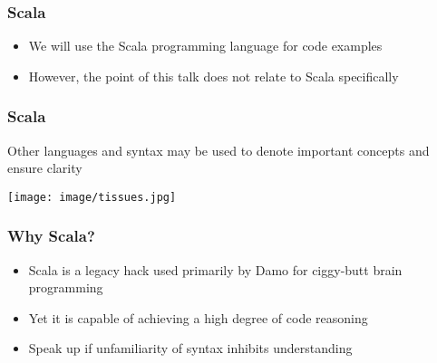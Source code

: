 \begin{frame}
\frametitle{Scala}
\begin{itemize}
  \item We will use the Scala programming language for code examples
  \item However, the point of this talk does not relate to Scala specifically
\end{itemize}
\end{frame}

\begin{frame}
\frametitle{Scala}
\begin{center}
Other languages and syntax may be used to denote important concepts and ensure clarity
\end{center}
\begin{center}
\texttt{[image: image/tissues.jpg]}
\end{center}
\end{frame}

\begin{frame}
\frametitle{Why Scala?}
\begin{itemize}
  \item Scala is a legacy hack used primarily by Damo for ciggy-butt brain
        programming
  \item Yet it is capable of achieving a high degree of code reasoning
  \item Speak up if unfamiliarity of syntax inhibits understanding
\end{itemize}
\end{frame}

